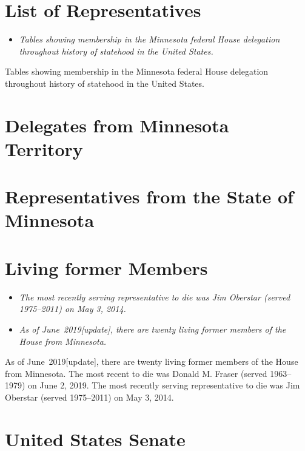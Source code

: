 \section{List of Representatives}\label{list-of-representatives}

\begin{itemize}
\item
  \emph{Tables showing membership in the Minnesota federal House
  delegation throughout history of statehood in the United States.}
\end{itemize}

Tables showing membership in the Minnesota federal House delegation
throughout history of statehood in the United States.

\section{Delegates from Minnesota
Territory}\label{delegates-from-minnesota-territory}

\section{Representatives from the State of
Minnesota}\label{representatives-from-the-state-of-minnesota}

\section{Living former Members}\label{living-former-members}

\begin{itemize}
\item
  \emph{The most recently serving representative to die was Jim Oberstar
  (served 1975--2011) on May 3, 2014.}
\item
  \emph{As of June~2019{[}update{]}, there are twenty living former
  members of the House from Minnesota.}
\end{itemize}

As of June~2019{[}update{]}, there are twenty living former members of
the House from Minnesota. The most recent to die was Donald M. Fraser
(served 1963--1979) on June 2, 2019. The most recently serving
representative to die was Jim Oberstar (served 1975--2011) on May 3,
2014.

\section{United States Senate}\label{united-states-senate}

